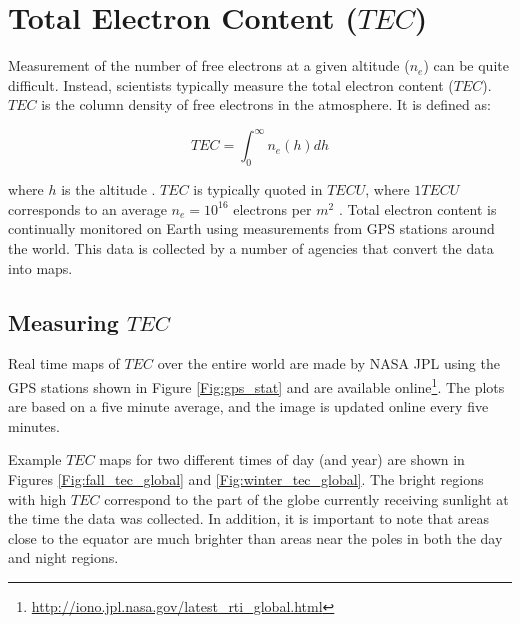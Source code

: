 \section{Total Electron Content ($TEC$)}
Measurement of the number of free electrons at a given altitude ($n_e$) can be quite difficult. Instead, scientists typically measure the total electron content ($TEC$). $TEC$ is the column density of free electrons in the atmosphere. It is defined as:

\begin{equation}
TEC = \int_0^\infty n_e (h) dh 
\end{equation}

where $h$ is the altitude \cite{thompson_2001}. $TEC$ is typically quoted in $TECU$, where $1 TECU$ corresponds to an average $n_e = 10^{16}$ electrons per $m^2$ \cite{vedantham_2014}. Total electron content is continually monitored on Earth using measurements from GPS stations around the world. This data is collected by a number of agencies that convert the data into maps. 

\subsection{Measuring $TEC$}
Real time maps of $TEC$ over the entire world are made by NASA JPL using the GPS stations shown in Figure \ref{Fig:gps_stat} and are available online\footnote{\url{http://iono.jpl.nasa.gov/latest_rti_global.html}}. The plots are based on a five minute average, and the image is updated online every five minutes. 

Example $TEC$ maps for two different times of day (and year) are shown in Figures \ref{Fig:fall_tec_global} and \ref{Fig:winter_tec_global}.  The bright regions with high $TEC$ correspond to the part of the globe currently receiving sunlight at the time the data was collected. In addition, it is important to note that areas close to the equator are much brighter than areas near the poles in both the day and night regions.

